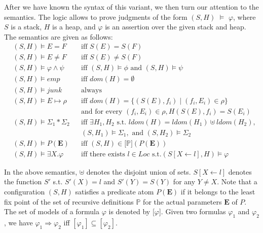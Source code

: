 \documentclass{article}
\theoremstyle{plain}
\begin{document}
After we have known the syntax of this variant, we then turn our attention to the semantics. The logic allows to prove judgments of the form $(S,H)$ $\vDash$ $\varphi$, where $S$ is a stack, $H$ is a heap, and $\varphi$ is an assertion over the given stack and heap. The semantics are given as follows:
\begin{align*}
   & (S,H) \models E = F  & &\text{iff } S(E) = S(F)\\
   & (S,H) \models E \neq F & &\text{iff }  S(E) \neq S(F)\\
   & (S,H) \models \varphi \wedge \psi & &\text{iff } (S,H) \models \phi \text{ and } (S,H) \models \psi\\
    &(S,H) \models emp & &\text{iff } dom(H) = \emptyset\\
    &(S,H) \models junk  \quad  & &\text{always}\\
    &(S,H) \models E \mapsto \rho & &\text{iff } dom(H) = \{(S(E),f_i) \mid (f_i,E_i) \in \rho\} \\ & & &\text{and for every } (f_i,E_i) \in \rho , H(S(E),f_i) = S(E_i) \\
    &(S,H) \models \Sigma_1 \ast \Sigma_2 & &\text{iff }  \exists H_1 , H_2 \text{ s.t. } ldom(H)=ldom(H_1) \uplus ldom(H_2),\\ & & &(S,H_1) \models \Sigma_1, \text{ and } (S,H_2) \models \Sigma_2\\
    &(S,H) \models P(\mathbf{E}) & &\text{iff } (S,H) \in  \mathbb{[}\mathbb{P]}(P(\mathbf{E}))\\
    &(S,H) \models \exists X.\varphi & &\text{iff } \text{there exists }  \mathit{l} \in Loc \text{ s.t.}  (S[X \gets \mathit{l}], H) \models \varphi
\end{align*}

In the above semantics, $\uplus$ denotes the disjoint union of sets. $ S[X\gets\mathit{l}]$ denotes the function $S'$ s.t. $S'(X) = l$ and $S'(Y)=S(Y)$ for any $Y \ne X$. Note that a configuration $(S,H)$ satisfies a predicate atom $P(\mathbf{E})$ if it belongs to the least fix point of the set of recursive definitions $\mathbb{P}$ for the actual parameters $\mathbf{E}$ of $P$. The set of models of a formula $\varphi$ is denoted by [$\varphi$]. Given two formulas $\varphi_1$ and $\varphi_2$, we have $\varphi_1 \Rightarrow \varphi_2$ iff $[\varphi_1] \subseteq [\varphi_2]$.
\end{document}
